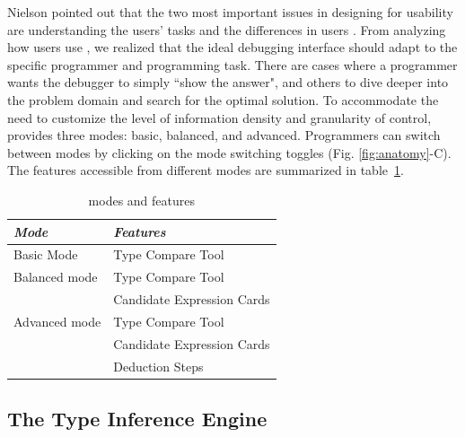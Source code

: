 Nielson pointed out  that the two most important issues in designing for usability are understanding the users' tasks and the differences in users \cite{jakob_nielsen_usability_1993}. From analyzing how users use \chameleon{}, we realized that the ideal debugging interface should adapt to the specific programmer and programming task. There are cases where a programmer wants the debugger to simply ``show the answer", and others to dive deeper into the problem domain and search for the optimal solution. To accommodate the need to customize the level of information density and granularity of control, \chameleon{} provides three modes: basic, balanced, and advanced. Programmers can switch between modes by clicking on the mode switching toggles (Fig. \ref{fig:anatomy}-C). The features accessible from different modes are summarized in table~\ref{tab:chameleon-features}.%

\begin{table}
    \centering
\begin{scriptsize}
\begin{center}

    \begin{tabular}{ l l  }
     \textit{Mode} & \textit{Features} \\ \hline
     Basic Mode & Type Compare Tool \\ \hline
     Balanced mode & Type Compare Tool \\
     & Candidate Expression Cards \\  \hline
     Advanced mode & Type Compare Tool \\
     & Candidate Expression Cards \\
     & Deduction Steps \\
    \end{tabular}
    \end{center}
\end{scriptsize}
    \caption{\chameleon{} modes and features}
    \label {tab:chameleon-features}
\end{table}


\subsection{The Type Inference Engine}
\label{sec:typeinferenceengine}

